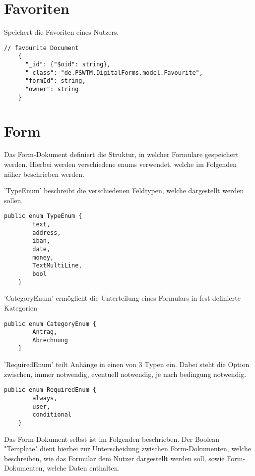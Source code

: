\section{Favoriten}
Speichert die Favoriten eines Nutzers.
\begin{lstlisting}[label={lst:favourite}]
    // favourite Document
    {
      "_id": {"$oid": string},
      "_class": "de.PSWTM.DigitalForms.model.Favourite",
      "formId": string,
      "owner": string
    }

\end{lstlisting}


\section{Form}\label{sec:form}
Das Form-Dokument definiert die Struktur, in welcher Formulare gespeichert werden.
Hierbei werden verschiedene \gls{enum}s verwendet, welche im Folgenden näher beschrieben werden.


'TypeEnum' beschreibt die verschiedenen Feldtypen, welche dargestellt werden sollen.
\begin{lstlisting}[label={lst:TypeEnum}]
    public enum TypeEnum {
        text,
        address,
        iban,
        date,
        money,
        TextMultiLine,
        bool
    }
\end{lstlisting}


'CategoryEnum' ermöglicht die Unterteilung eines Formulars in fest definierte Kategorien
\begin{lstlisting}[label={lst:CategoryEnum}]
    public enum CategoryEnum {
        Antrag,
        Abrechnung
    }
\end{lstlisting}


'RequiredEnum' teilt Anhänge in einen von 3 Typen ein.
Dabei steht die Option zwischen, immer notwendig, eventuell notwendig, je nach bedingung notwendig.
\begin{lstlisting}[label={lst:RequiredEnum}]
    public enum RequiredEnum {
        always,
        user,
        conditional
    }
\end{lstlisting}


Das Form-Dokument selbst ist im Folgenden beschrieben.
Der Boolean "Template" dient hierbei zur Unterscheidung zwischen
Form-Dokumenten, welche beschreiben, wie das Formular dem Nutzer
dargestellt werden soll, sowie Form-Dokumenten, welche Daten enthalten.

